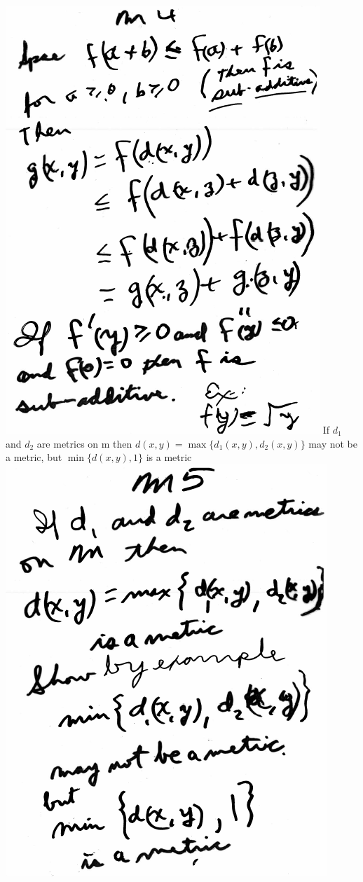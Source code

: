 \documentclass[10pt,a4paper]{article}
\begin{document}
{{\includegraphics[scale=.5]{Pages/MS_2_im4}
\newpage
If $d_1$ and $d_2$ are metrics on m then
\newline
$d(x,y)=\max \{ d_1(x,y),d_2(x,y) \}$ may not be a metric, but
\newline
$\min \{ d(x,y),1 \}$ is a metric
\newline
\includegraphics[scale=.5]{Pages/MS_2_im5}
}}
\end{document}
